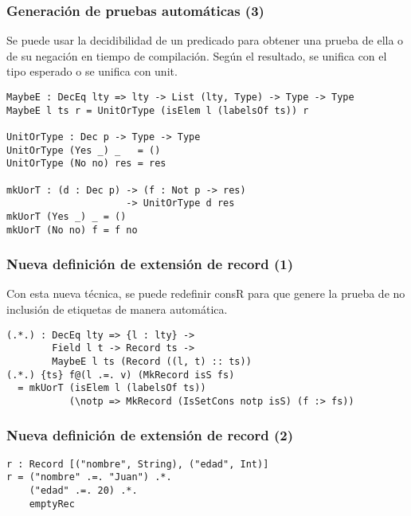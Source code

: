 \documentclass{beamer}
\begin{document}
\begin{frame}[fragile]
\frametitle{Generación de pruebas automáticas (3)}

Se puede usar la decidibilidad de un predicado para obtener una prueba de ella o de su negación en tiempo de compilación. Según el resultado, se unifica con el tipo esperado o se unifica con unit.

\pause

\begin{definition}
\begin{verbatim}
MaybeE : DecEq lty => lty -> List (lty, Type) -> Type -> Type
MaybeE l ts r = UnitOrType (isElem l (labelsOf ts)) r

UnitOrType : Dec p -> Type -> Type
UnitOrType (Yes _) _   = ()
UnitOrType (No no) res = res

mkUorT : (d : Dec p) -> (f : Not p -> res)
                     -> UnitOrType d res
mkUorT (Yes _) _ = ()
mkUorT (No no) f = f no
\end{verbatim}
\end{definition}

\end{frame}

\begin{frame}[fragile]
\frametitle{Nueva definición de extensión de record (1)}

Con esta nueva técnica, se puede redefinir consR para que genere la prueba de no inclusión de etiquetas de manera automática.

\pause

\begin{definition}
\begin{verbatim}
(.*.) : DecEq lty => {l : lty} ->
        Field l t -> Record ts ->
        MaybeE l ts (Record ((l, t) :: ts))
(.*.) {ts} f@(l .=. v) (MkRecord isS fs)
  = mkUorT (isElem l (labelsOf ts))
           (\notp => MkRecord (IsSetCons notp isS) (f :> fs))
\end{verbatim}
\end{definition}

\end{frame}

\begin{frame}[fragile]
\frametitle{Nueva definición de extensión de record (2)}

\begin{example}
\begin{verbatim}
r : Record [("nombre", String), ("edad", Int)]
r = ("nombre" .=. "Juan") .*.
    ("edad" .=. 20) .*.
    emptyRec
\end{verbatim}
\end{example}

\end{frame}
\end{document}
